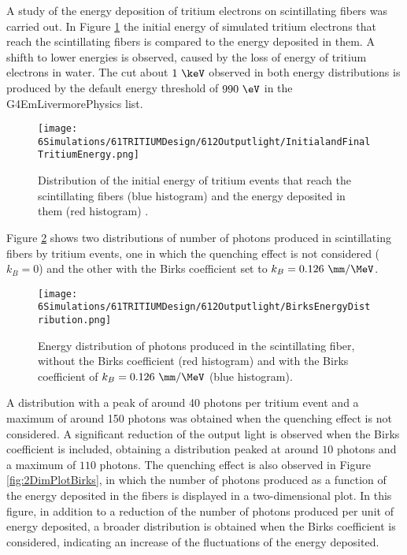 A study of the energy deposition of tritium electrons on scintillating fibers was carried out. In Figure \ref{fig:InitialFinalTritiumEnergy} the initial energy of simulated tritium electrons that reach the scintillating fibers is compared to the energy deposited in them. A shifth to lower energies is observed, caused by the loss of energy of tritium electrons in water. The cut about $1~\keV$ observed in both energy distributions is produced by the default energy threshold of $990~\eV$ in the G4EmLivermorePhysics list.
\begin{figure}[h]
\centering
\texttt{[image: 6Simulations/61TRITIUMDesign/612Outputlight/InitialandFinalTritiumEnergy.png]}
\caption{Distribution of the initial energy of tritium events that reach the scintillating fibers (blue histogram) and the energy deposited in them (red histogram) \cite{SimulationPaperCarlos}.\label{fig:InitialFinalTritiumEnergy}}
\end{figure}
Figure \ref{fig:BirksEffectinEnergyDistribution} shows two distributions of number of photons produced in scintillating fibers by tritium events, one in which the quenching effect is not considered ($k_B=0$) and the other with the Birks coefficient set to $k_B=0.126~\mm/\MeV$.
\begin{figure}[h]
\centering
\texttt{[image: 6Simulations/61TRITIUMDesign/612Outputlight/BirksEnergyDistribution.png]}
\caption{Energy distribution of photons produced in the scintillating fiber, without the Birks coefficient (red histogram) and with the Birks coefficient of $k_B=0.126~\mm/\MeV$ (blue histogram)\cite{SimulationPaperCarlos}.\label{fig:BirksEffectinEnergyDistribution}}
\end{figure}  
A distribution with a peak of around 40 photons per tritium event and a maximum of around 150 photons was obtained when the quenching effect is not considered. A significant reduction of the output light is observed when the Birks coefficient is included, obtaining a distribution peaked at around $10$ photons and a maximum of $110$ photons. The quenching effect is also observed in Figure \ref{fig:2DimPlotBirks}, in which the number of photons produced  as a function of the energy deposited in the fibers is displayed in a two-dimensional plot. In this figure, in addition to a reduction of the number of photons produced per unit of energy deposited, a broader distribution is obtained when the Birks coefficient is considered, indicating an increase of the fluctuations of the energy deposited.

